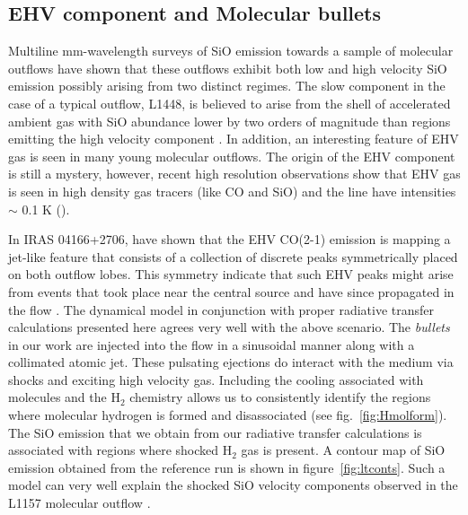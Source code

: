 \documentclass[useAMS,usenatbib]{mn2e}
\begin{document}
\subsection{EHV component and Molecular bullets}
\label{ssec:EHV}
Multiline mm-wavelength surveys of SiO emission towards a sample of molecular
outflows have shown that these outflows exhibit both low and high
velocity SiO emission possibly arising from two distinct regimes. The slow
component in the case of a typical outflow, L1448, is believed to arise from
the shell of accelerated ambient gas with SiO abundance
lower by two orders of magnitude than regions emitting the high
velocity component
\cite{Codella:1999p12584}. In addition, an interesting feature of EHV
gas is seen in many young molecular outflows. The origin of the EHV
component is still a mystery, however, recent high resolution
observations show that EHV gas is seen in
high density gas tracers (like CO and SiO) and the line have
intensities $\sim$ 0.1 K (\citealt{Tafalla:2010p14759}).
%

In IRAS 04166+2706, \cite{SantiagoGarcia:2009p13972} have shown 
that the EHV CO(2-1) emission is mapping a jet-like
feature that consists of a collection of
discrete peaks symmetrically placed on both outflow lobes. This symmetry
indicate that such EHV peaks might arise from events that took place
near the central source and have since propagated in the flow
\citep{Bachiller:1990p11196, Tafalla:2011p14051}. The dynamical 
model in conjunction with proper radiative transfer calculations presented here 
agrees very well with the above scenario. The {\em{bullets}} in our
work are injected into the flow in a sinusoidal manner along with a
collimated atomic jet. These pulsating ejections do interact with the medium
via shocks and exciting high velocity gas. Including the cooling associated with
molecules and the H$_{2}$ chemistry allows us to
consistently identify the regions where molecular hydrogen is formed
and disassociated (see fig.~\ref{fig:Hmolform}). The SiO emission that we
obtain from our radiative transfer calculations is associated with
regions where shocked H$_{2}$ gas is present. A contour map of SiO
emission obtained from the reference run is shown in
figure~\ref{fig:ltconts}. Such a model can very well explain the
shocked SiO velocity components observed in the L1157 molecular outflow \cite{Gueth:1998p14058}. 
%
 
\end{document}
